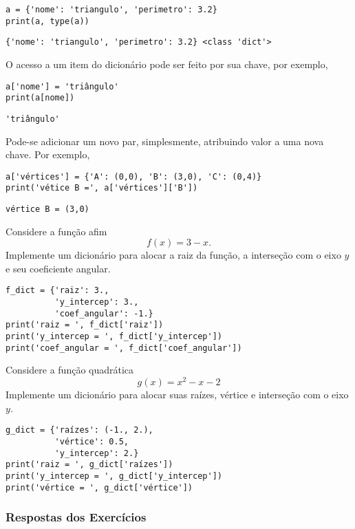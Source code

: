 \begin{lstlisting}
a = {'nome': 'triangulo', 'perimetro': 3.2}
print(a, type(a))
\end{lstlisting}

\begin{verbatim}
{'nome': 'triangulo', 'perimetro': 3.2} <class 'dict'>
\end{verbatim}


O acesso a um item do dicionário pode ser feito por sua chave, por exemplo,

\begin{lstlisting}
a['nome'] = 'triângulo'
print(a[nome])
\end{lstlisting}

\begin{verbatim}
'triângulo'
\end{verbatim}

Pode-se adicionar um novo par, simplesmente, atribuindo valor a uma nova chave. Por exemplo,

\begin{lstlisting}
a['vértices'] = {'A': (0,0), 'B': (3,0), 'C': (0,4)}
print('vétice B =', a['vértices']['B'])
\end{lstlisting}

\begin{verbatim}
vértice B = (3,0)
\end{verbatim}


\begin{exer}
  Considere a função afim
  \begin{equation}
    f(x) = 3 - x.
  \end{equation}
  Implemente um dicionário para alocar a raiz da função, a interseção com o eixo $y$ e seu coeficiente angular.
\end{exer}
\begin{resp}

\begin{lstlisting}
f_dict = {'raiz': 3.,
          'y_intercep': 3.,
          'coef_angular': -1.}
print('raiz = ', f_dict['raiz'])
print('y_intercep = ', f_dict['y_intercep'])
print('coef_angular = ', f_dict['coef_angular'])
\end{lstlisting}

\end{resp}

\begin{exer}
  Considere a função quadrática
  \begin{equation}
    g(x) = x^2 - x - 2
  \end{equation}
  Implemente um dicionário para alocar suas raízes, vértice e interseção com o eixo $y$.
\end{exer}
\begin{resp}

\begin{lstlisting}
g_dict = {'raízes': (-1., 2.),
          'vértice': 0.5,
          'y_intercep': 2.}
print('raiz = ', g_dict['raízes'])
print('y_intercep = ', g_dict['y_intercep'])
print('vértice = ', g_dict['vértice'])
\end{lstlisting}

\end{resp}

\ifisbook 
\subsubsection*{Respostas dos Exercícios}
\shipoutAnswer
\fi
